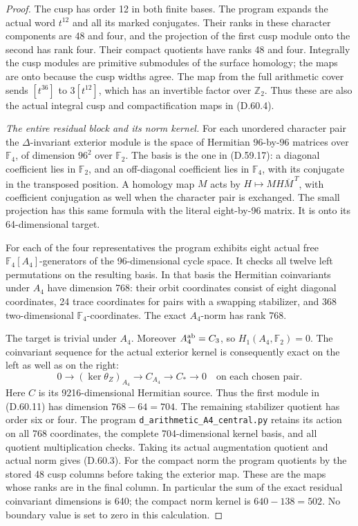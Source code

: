 \begin{proof}
The cusp has order 12 in both finite bases.
The program expands the actual word
\(t^{12}\) and all its marked conjugates.
Their ranks in these character components
are 48 and four, and the projection of
the first cusp module onto the second has
rank four. Their compact quotients have
ranks 48 and four. Integrally the cusp
modules are primitive submodules of the
surface homology; the maps are onto
because the cusp widths agree. The map
from the full arithmetic cover sends
\([t^{36}]\) to \(3[t^{12}]\), which
has an invertible factor over \(\mathbb Z_2\).
Thus these are also the actual integral
cusp and compactification maps in (D.60.4).

\emph{The entire residual block and its norm kernel.}
For each unordered character pair the
\(\Delta\)-invariant exterior module is
the space of Hermitian \(96\)-by-\(96\)
matrices over \(\mathbb F_4\), of dimension
\(96^2\) over \(\mathbb F_2\). The basis
is the one in (D.59.17): a diagonal
coefficient lies in \(\mathbb F_2\), and
an off-diagonal coefficient lies in
\(\mathbb F_4\), with its conjugate in
the transposed position. A homology map
\(M\) acts by
\(H\mapsto MH\overline M^{\,T}\), with
coefficient conjugation as well when the
character pair is exchanged. The small
projection has this same formula with
the literal eight-by-96 matrix. It is
onto its 64-dimensional target.

For each of the four representatives the
program exhibits eight actual free
\(\mathbb F_4[A_4]\)-generators of the
96-dimensional cycle space. It checks all
twelve left permutations on the resulting
basis. In that basis the Hermitian
coinvariants under \(A_4\) have dimension
768: their orbit coordinates consist of
eight diagonal coordinates, 24 trace
coordinates for pairs with a swapping
stabilizer, and 368 two-dimensional
\(\mathbb F_4\)-coordinates. The exact
\(A_4\)-norm has rank 768.

The target is trivial under \(A_4\).
Moreover \(A_4^{\rm ab}=C_3\), so
\(H_1(A_4,\mathbb F_2)=0\). The
coinvariant sequence for the actual
exterior kernel is consequently exact
on the left as well as on the right:
\[
 0\longrightarrow (\ker\theta_Z)_{A_4}
   \longrightarrow C_{A_4}
   \longrightarrow C_*\longrightarrow0
 \quad\text{on each chosen pair}.
 \tag{D.60.11}
\]
Here \(C\) is its 9216-dimensional
Hermitian source. Thus the first module
in (D.60.11) has dimension \(768-64=704\).
The remaining stabilizer quotient has
order six or four. The program
\texttt{d\_arithmetic\_A4\_central.py}
retains its action on all 768 coordinates,
the complete 704-dimensional kernel basis,
and all quotient multiplication checks.
Taking its actual augmentation quotient
and actual norm gives (D.60.3).
For the compact norm the program quotients
by the stored 48 cusp columns before
taking the exterior map. These are the
maps whose ranks are in the final column.
In particular the sum of the exact
residual coinvariant dimensions is 640;
the compact norm kernel is \(640-138=502\).
No boundary value is set to zero in this
calculation.


\end{proof}
